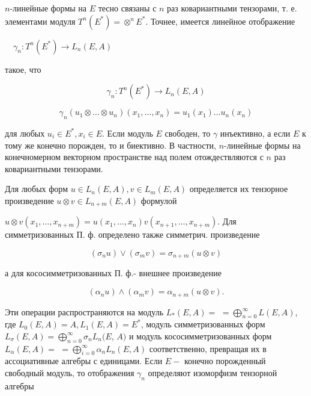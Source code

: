 \documentclass[10pt]{article}
\begin{document}
$n$-линейные формы на $E$ тесно связаны с $n$ раз ковариантными тензорами, т. е. элементами модуля $T^{n}\left(E^{*}\right)=\otimes^{n} E^{*}$. Точнее, имеется линейное отображение



$\quad \gamma_{n}: T^{n}\left(E^{*}\right) \longrightarrow L_{n}(E, A)$



такое, что



\[

\gamma_{n}: T^{n}\left(E^{*}\right) \longrightarrow L_{n}(E, A)

\]



\[

\gamma_{n}\left(u_{1} \otimes \ldots \otimes u_{n}\right)\left(x_{1}, \ldots, x_{n}\right)=u_{1}\left(x_{1}\right) \ldots u_{n}\left(x_{n}\right)

\]



для любых $u_{i} \in E^{*}, x_{i} \in E$. Если модуль $E$ свободен, то $\gamma$ инъективно, а если $E$ к тому же конечно порожден, то и биективно. В частности, $n$-линейные формы на конечномерном векторном пространстве над полем отождествляются с $n$ раз ковариантными тензорами.



Для любых форм $u \in L_{n}(E, A), v \in L_{m}(E, A)$ определяется их тензорное произведение $u \otimes v \in L_{n+m}(E, A)$ формулой



$u \otimes v\left(x_{1}, \ldots, x_{n+m}\right)=u\left(x_{1}, \ldots, x_{n}\right) v\left(x_{n+1}, \ldots, x_{n+m}\right)$. Для симметризованных П. ф. определено также симметрич. произведение



\[

\left(\sigma_{n} u\right) \vee\left(\sigma_{m} v\right)=\sigma_{n+m}(u \otimes v)

\]



а для кососимметризованных П. ф.- внешнее произведение



\[

\left(\alpha_{n} u\right) \wedge\left(\alpha_{m} v\right)=\alpha_{n+m}(u \otimes v) .

\]



Эти операции распространяются на модуль $L_{*}(E, A)=$ $=\bigoplus_{n=0}^{\infty} L(E, A)$, где $L_{0}(E, A)=A, L_{1}(E, A)=E^{*}$, модуль симметризованных форм $L_{\sigma}(E, A)=\bigoplus_{n=0}^{\infty} \sigma_{n} L_{n}(E$, $A)$ и модуль кососимметризованных форм $L_{\alpha}(E, A)=$ $=\bigoplus_{i=0}^{\infty} \alpha_{n} L_{n}(E, A)$ соответственно, превращая их в ассоциативные алгебры с единицами. Если $E-$ конечно порожденный свободный модуль, то отображения $\gamma_{n}$ определяют изоморфизм тензорной алгебры
\end{document}
